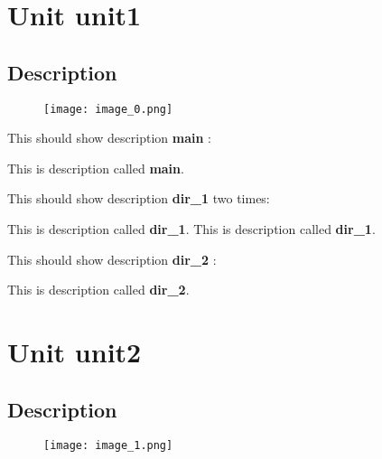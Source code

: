 \documentclass{report}
\newif\ifpdf
\begin{document}
\label{toc}\tableofcontents
\newpage
\newlength{\tmplength}
\chapter{Unit unit1}
\label{unit1}
\section{Description}
\begin{figure}
  \ifpdf
    \texttt{[image: image\_0.png]}
  \else
    \texttt{[image: image\_0.png]}
  \fi
\end{figure}


This should show description \textbf{main} :

This is description called \textbf{main}. 

This should show description \textbf{dir{\_}1} two times:

This is description called \textbf{dir{\_}1}.  This is description called \textbf{dir{\_}1}. 

This should show description \textbf{dir{\_}2} :

This is description called \textbf{dir{\_}2}. 
\chapter{Unit unit2}
\label{unit2}
\section{Description}
\begin{figure}
  \ifpdf
    \texttt{[image: image\_1.png]}
  \else
    \texttt{[image: image\_1.png]}
  \fi
\end{figure}
\end{document}
